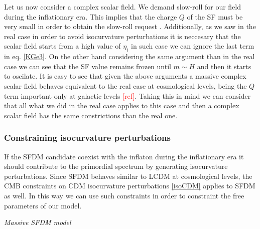 \documentclass[amssymb,twocolumn,prd,nofootinbib,showpacs]{revtex4-1}
\begin{document}
Let us now consider a complex scalar field. %
We demand slow-roll for our field during the inflationary era. This implies that the charge $Q$ of the SF must be very small in order to obtain the slow-roll request \cite{atractorinf1,atractorinf12}. Additionally, as we saw in the real case in order to avoid isocurvature perturbations it is neccesary that the scalar field starts from a high value of $\eta_i$ in such case we can ignore the last term in eq. \eqref{KGe3}. On the other hand considering the same argument than in the real case we can see that the SF value remains frozen until $m\sim H$ and then it starts to oscilate. It is easy to see that given the above arguments a massive complex scalar field behaves equivalent to the real case at cosmological levels, being the $Q $ term important only at galactic levels \textcolor{red}{[ref]}. Taking this in mind we can consider that all what we did in the real case applies to this case and then a complex scalar field has the same constrictions than the real one. 


\subsubsection{Constraining isocurvature perturbations}

If the SFDM candidate coexist with the inflaton during the inflationary era it should contribute to the primordial spectrum by generating isocurvature perturbations. Since SFDM behaves similar to LCDM at cosmological levels, the CMB constraints on CDM isocurvature perturbations \eqref{isoCDM} applies to SFDM as well. In this way we can use such constraints in order to constraint the free parameters of our model.
\begin{center}
\textit{Massive SFDM model}
\end{center}
\end{document}
